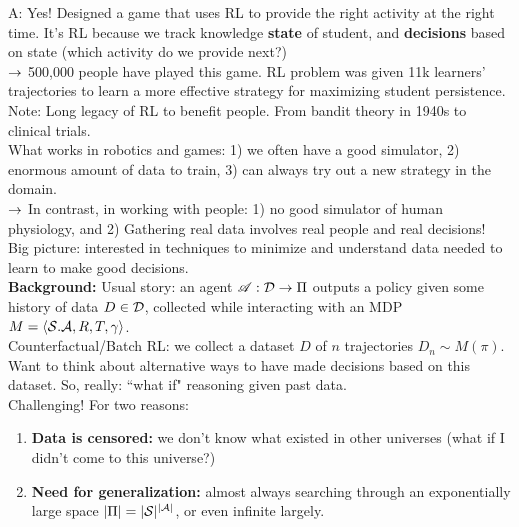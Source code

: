 A: Yes! Designed a game that uses RL to provide the right activity at the right time. It's RL because we track knowledge {\bf state} of student, and {\bf decisions} based on state (which activity do we provide next?) \\

$\rightarrow$ 500,000 people have played this game. RL problem was given 11k learners' trajectories to learn a more effective strategy for maximizing student persistence. \\

Note: Long legacy of RL to benefit people. From bandit theory in 1940s to clinical trials. \\

What works in robotics and games: 1) we often have a good simulator, 2) enormous amount of data to train, 3) can always try out a new strategy in the domain. \\

$\rightarrow$ In contrast, in working with people: 1) no good simulator of human physiology, and 2) Gathering real data involves real people and real decisions! \\

Big picture: interested in techniques to minimize and understand data needed to learn to make good decisions. \\

{\bf Background:} Usual story: an agent $\mathscr{A} : \mathcal{D} \rightarrow \Pi$ outputs a policy given some history of data $D \in \mathcal{D}$, collected while interacting with an MDP $M = \langle \mathcal{S}. \mathcal{A}, R, T, \gamma \rangle$. \\

Counterfactual/Batch RL: we collect a dataset $D$ of $n$ trajectories $D_n \sim M(\pi)$. \\

Want to think about alternative ways to have made decisions based on this dataset. So, really: ``what if" reasoning given past data. \\

Challenging! For two reasons:
\begin{enumerate}
    \item {\bf Data is censored:} we don't know what existed in other universes (what if I didn't come to this universe?)
    \item {\bf Need for generalization:} almost always searching through an exponentially large space $|\Pi| = |\mathcal{S}|^{|\mathcal{A}|}$, or even infinite largely.
\end{enumerate}

